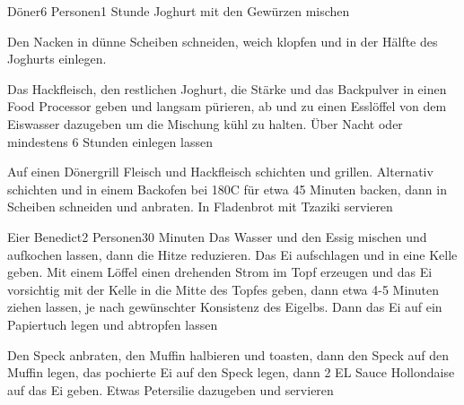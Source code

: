 \begin{recipe}{Döner}{6 Personen}{1 Stunde}
Joghurt mit den Gewürzen mischen

Den Nacken in dünne Scheiben schneiden, weich klopfen und in der Hälfte des Joghurts einlegen.

Das Hackfleisch, den restlichen Joghurt, die Stärke und das Backpulver in einen Food Processor geben und langsam pürieren, ab und zu einen Esslöffel von dem Eiswasser dazugeben um die Mischung kühl zu halten.
Über Nacht oder mindestens 6 Stunden einlegen lassen

\ing[]{}{}
Auf einen Dönergrill Fleisch und Hackfleisch schichten und grillen. Alternativ schichten und in einem Backofen bei 180\0C für etwa 45 Minuten backen, dann in Scheiben schneiden und anbraten.
In Fladenbrot mit Tzaziki servieren
\end{recipe}


\begin{recipe}{Eier Benedict}{2 Personen}{30 Minuten}
Das Wasser und den Essig mischen und aufkochen lassen, dann die Hitze reduzieren.
Das Ei aufschlagen und in eine Kelle geben.
Mit einem Löffel einen drehenden Strom im Topf erzeugen und das Ei vorsichtig mit der Kelle in die Mitte  des Topfes geben, dann etwa 4-5 Minuten ziehen lassen, je nach gewünschter Konsistenz des Eigelbs.
Dann das Ei auf ein Papiertuch legen und abtropfen lassen

Den Speck anbraten, den Muffin halbieren und toasten, dann den Speck auf den Muffin legen, das pochierte Ei auf den Speck legen, dann 2 EL Sauce Hollondaise auf das Ei geben.
Etwas Petersilie dazugeben und servieren
\end{recipe}


